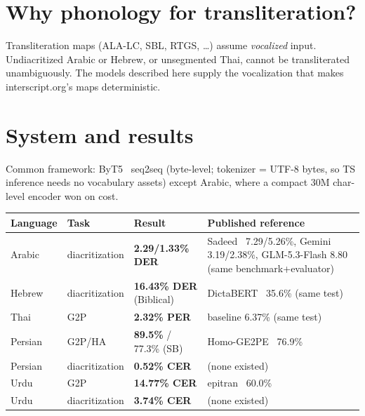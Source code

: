 \documentclass[11pt]{article}
\begin{document}
\section{Why phonology for transliteration?}
Transliteration maps (ALA-LC, SBL, RTGS, \dots) assume \emph{vocalized}
input. Undiacritized Arabic or Hebrew, or unsegmented Thai, cannot be
transliterated unambiguously. The models described here supply the
vocalization that makes interscript.org's maps deterministic.

\section{System and results}
Common framework: ByT5~\cite{byt5} seq2seq (byte-level; tokenizer = UTF-8 bytes, so
TS inference needs no vocabulary assets) except Arabic, where a compact
30M char-level encoder won on cost.

\begin{table}[h]
\centering
\small
\begin{tabular}{llll}
\toprule
Language & Task & Result & Published reference \\
\midrule
Arabic & diacritization & \textbf{2.29/1.33\% DER} & Sadeed~\cite{sadeed} 7.29/5.26\%, Gemini 3.19/2.38\%, GLM-5.3-Flash 8.80 (same benchmark+evaluator) \\
Hebrew & diacritization & \textbf{16.43\% DER} (Biblical) & DictaBERT~\cite{dictabert} 35.6\% (same test) \\
Thai & G2P & \textbf{2.32\% PER} & baseline 6.37\% (same test) \\
Persian & G2P/HA & \textbf{89.5\%} / 77.3\% (SB) & Homo-GE2PE~\cite{homoge2pe} 76.9\% \\
Persian & diacritization & \textbf{0.52\% CER} & (none existed) \\
Urdu & G2P & \textbf{14.77\% CER} & epitran~\cite{epitran} 60.0\% \\
Urdu & diacritization & \textbf{3.74\% CER} & (none existed) \\
\bottomrule
\end{tabular}
\end{table}
\end{document}
